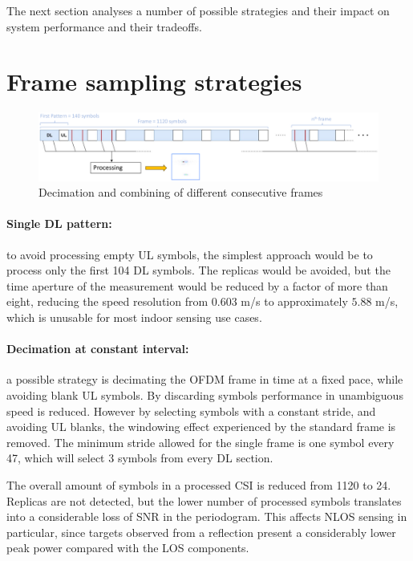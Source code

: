 	The next section analyses a number of possible strategies and their impact on system performance and their tradeoffs.    

\section{Frame sampling strategies}

    \begin{figure}[H]
        \centering
        \includegraphics[width=1\textwidth]{Images/TDDprocessing/TDDstrategies.eps}
        \caption{Decimation and combining of different consecutive frames}
        \label{fig:TDDstrategies}
    \end{figure}

    \paragraph{Single DL pattern:}
    to avoid processing empty UL symbols, the simplest approach would be to process only the first 104 DL symbols. The replicas would be avoided, but the time aperture of the measurement would be reduced by a factor of more than eight, reducing the speed resolution from $0.603$ m/s to approximately $5.88$ m/s, which is unusable for most indoor sensing use cases.
    
    \paragraph{Decimation at constant interval:}
     a possible strategy is decimating the OFDM frame in time at a fixed pace, while avoiding blank UL symbols. 
     By discarding symbols performance in unambiguous speed is reduced. However by selecting symbols with a constant stride, and avoiding UL blanks, the windowing effect experienced by the standard frame is removed.
     The minimum stride allowed for the single frame is one symbol every 47, which will select 3 symbols from every DL section.
     
     The overall amount of symbols in a processed CSI is reduced from 1120 to 24.
     Replicas are not detected, but the lower number of processed symbols translates into a considerable loss of SNR in the periodogram. 
     This affects NLOS sensing in particular, since targets observed from a reflection present a considerably lower peak power compared with the LOS components.

